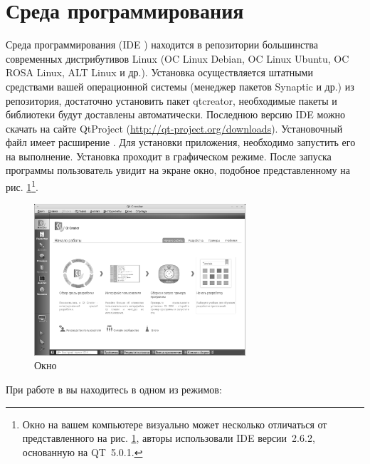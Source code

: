 \section[Среда программирования \Sys{Qt Creator}]{Среда программирования }
Среда программирования  
(IDE ) находится в репозитории
большинства современных дистрибутивов Linux (OC Linux Debian, OC Linux Ubuntu, OC ROSA Linux, ALT Linux и др.).
Установка осуществляется штатными средствами вашей операционной системы (менеджер пакетов Synaptic и др.) из
репозитория, достаточно установить пакет qtcreator, необходимые пакеты и библиотеки будут доставлены  автоматически.
Последнюю версию IDE  можно скачать на сайте QtProject (\url{http://qt-project.org/downloads}). 
Установочный файл имеет расширение . Для установки приложения, необходимо запустить его на выполнение.
Установка проходит в графическом режиме. После запуска программы пользователь увидит на экране окно, подобное
представленному на рис. \ref{ch01:refDrawing0}\footnote{Окно на вашем компьютере визуально может несколько отличаться от
представленного на рис. \ref{ch01:refDrawing0}, авторы использовали IDE  версии~2.6.2, основанную на QT~5.0.1.}.


\begin{figure}[htb]
\begin{center}
\includegraphics[width=0.7\textwidth]{img/ris_1_1_rus}
\caption{Окно }
\label{ch01:refDrawing0}
\end{center}
\end{figure}
При работе в  вы находитесь в одном из режимов:

